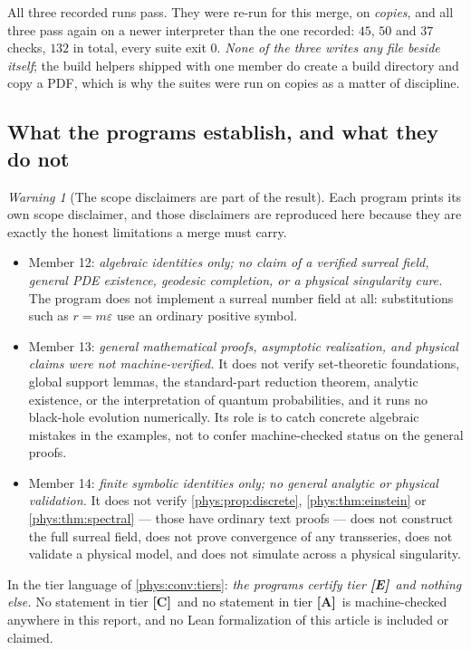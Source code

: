 \documentclass[11pt,letterpaper]{article}
\numberwithin{equation}{section}
\theoremstyle{definition}
\theoremstyle{remark}
\newtheorem{warning}[theorem]{Warning}
\newcommand{\eps}{\varepsilon}
\newcommand{\TE}{\textcolor{TierE}{\textsf{\bfseries[E]}}}
\newcommand{\TC}{\textcolor{TierC}{\textsf{\bfseries[C]}}}
\newcommand{\TA}{\textcolor{TierA}{\textsf{\bfseries[A]}}}
\begin{document}
All three recorded runs pass. They were re-run for this merge, on
\emph{copies}, and all three pass again on a newer interpreter than the one
recorded: $45$, $50$ and $37$ checks, $132$ in total, every suite exit $0$.
\emph{None of the three writes any file beside itself}; the build helpers
shipped with one member do create a build directory and copy a PDF, which is
why the suites were run on copies as a matter of discipline.

\subsection{What the programs establish, and what they do not}
\label{phys:app:sub:scope}

\begin{warning}[The scope disclaimers are part of the result]
\label{phys:warn:disclaimers}
Each program prints its own scope disclaimer, and those disclaimers are
reproduced here because they are exactly the honest limitations a merge must
carry.
\begin{itemize}[leftmargin=1.6em]
\item Member 12: \emph{algebraic identities only; no claim of a verified
surreal field, general PDE existence, geodesic completion, or a physical
singularity cure.} The program does not implement a surreal number field at
all: substitutions such as $r=m\eps$ use an ordinary positive symbol.
\item Member 13: \emph{general mathematical proofs, asymptotic realization, and
physical claims were not machine-verified.} It does not verify set-theoretic
foundations, global support lemmas, the standard-part reduction theorem,
analytic existence, or the interpretation of quantum probabilities, and it runs
no black-hole evolution numerically. Its role is to catch concrete algebraic
mistakes in the examples, not to confer machine-checked status on the general
proofs.
\item Member 14: \emph{finite symbolic identities only; no general analytic or
physical validation.} It does not verify \cref{phys:prop:discrete},
\cref{phys:thm:einstein} or \cref{phys:thm:spectral} --- those have
ordinary text proofs --- does not construct the full surreal field, does not
prove convergence of any transseries, does not validate a physical model, and
does not simulate across a physical singularity.
\end{itemize}
In the tier language of \cref{phys:conv:tiers}: \emph{the programs certify tier
\TE\ and nothing else.} No statement in tier \TC\ and no statement in tier \TA\
is machine-checked anywhere in this report, and no Lean formalization of this
article is included or claimed.
\end{warning}
\end{document}
